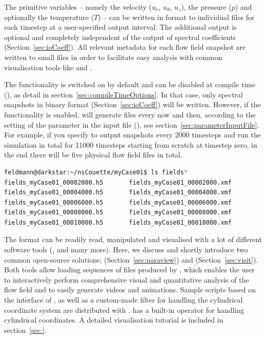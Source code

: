 \documentclass[a4paper, 11pt, DIV=11]{scrartcl}
\begin{document}
The primitive variables -- namely the velocity ($u_r$, $u_{\theta}$, $u_{z}$),
the pressure ($p$) and optionally the temperature ($T$) -- can be written in
\hdf format to individual files for each timestep at a user-specified output
interval. The additional \hdf output is optional and completely independent of
the output of spectral coefficients (Section~\ref{sec:ioCoeff}). All relevant
metadata for each flow field snapshot are written to small \xmf files in order
to facilitate easy analysis with common visualisation tools like \paraview and
\visit.
\par
The \hdf functionality is switched on by default and can be disabled at compile
time (), as detail in section~\ref{sec:compileTimeOptions}.
In that case, only spectral snapshots in binary format (Section~\ref{sec:ioCoeff})
will be written. However, if the \hdf functionality is enabled, \nsc will generate
 files every now and then, according to the setting of the
 parameter in the input file (), see
section~\ref{sec:parameterInputFile}. For example, if you specify to output snapshots
every \num{2000} timesteps and run the simulation in total for \num{11000} timesteps
starting from scratch at timestep zero, in the end there will be five physical flow
field files in total.
\begin{lstlisting}[language=bash]
feldmann@darkstar:~/nsCouette/myCase01$ ls fields*
fields_myCase01_00002000.h5       fields_myCase01_00002000.xmf
fields_myCase01_00004000.h5       fields_myCase01_00004000.xmf
fields_myCase01_00006000.h5       fields_myCase01_00006000.xmf
fields_myCase01_00008000.h5       fields_myCase01_00008000.xmf
fields_myCase01_00010000.h5       fields_myCase01_00010000.xmf
\end{lstlisting}
The \hdf format can be readily read, manipulated and visualised with a lot of different
software tools (\eg \python, \plplot and many more). Here, we discuss and shortly
introduce two common open-source solutions; \ie \paraview (Section~\ref{sec:paraview})
and \visit (Section~\ref{sec:visit}). Both tools allow loading sequences of \xmf files
produced by \nsc, which enables the user to interactively perform comprehensive visual
and quantitative analysis of the flow field and to easily generate videos and animations.
Sample scripts based on the \python interface of \visit, as well as a custom-made \paraview
filter for handling the cylindrical coordinate system are distributed with \nsc. \visit
has a built-in operator for handling cylindrical coordinates. A detailed visualisation
tutorial is included in section~\ref{sec:}.
\end{document}
